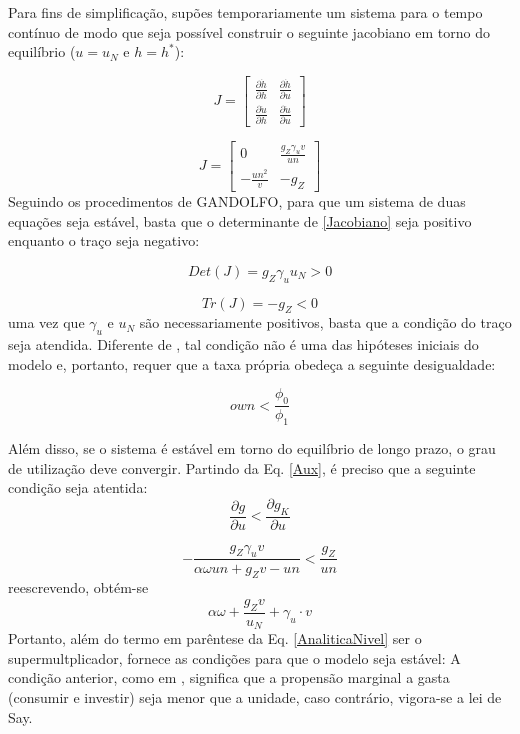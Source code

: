 Para fins de simplificação, supões temporariamente um sistema para o tempo contínuo de modo que seja possível construir o seguinte jacobiano em torno do equilíbrio ($u = u_N$ e $h = h^*$):

$$
J = 
\left[\begin{matrix}
\frac{\partial \dot h}{\partial h} & \frac{\partial \dot h}{\partial u}\\
\frac{\partial \dot u}{\partial h} & \frac{\partial \dot u}{\partial u}
\end{matrix}\right]
$$

\begin{equation}
J = 
\label{Jacobiano}
\left[\begin{matrix}0 & \frac{g_Z \gamma_{u} v}{un}\\- \frac{un^{2}}{v} & - g_Z\end{matrix}\right]
\end{equation}
Seguindo os procedimentos de GANDOLFO, para que um sistema de duas equações seja estável, basta que o determinante de \ref{Jacobiano} seja positivo enquanto o traço seja negativo:

$$
Det(J) = g_Z \gamma_{u} u_N > 0
$$

$$
Tr(J) = -g_Z < 0
$$
uma vez que $\gamma_u$ e $u_N$ são necessariamente positivos, basta que a condição do traço seja atendida. Diferente de \textcite{freitas_growth_2015}, tal condição não é uma das hipóteses iniciais do modelo e, portanto, requer que a taxa própria obedeça a seguinte desigualdade:

\begin{equation}
own < \frac{\phi_0}{\phi_1}
\end{equation}

Além disso, se o sistema é estável em torno do equilíbrio de longo prazo, o grau de utilização deve convergir. Partindo da Eq. \ref{Aux}, é preciso que a seguinte condição seja atentida:
$$
\frac{\partial g}{\partial u} < \frac{\partial g_K}{\partial u}
$$

$$
- \frac{g_Z \gamma_{u} v}{\alpha \omega un + g_Z v - un} < \frac{g_Z}{un}
$$
reescrevendo, obtém-se
\begin{equation}
\alpha \omega + \frac{g_Z v}{u_N} + \gamma_u\cdot v
\end{equation}
Portanto, além do termo em parêntese da Eq. \ref{AnaliticaNivel} ser o supermultplicador, fornece as condições para que o modelo seja estável: 
A condição anterior, como em \textcite{freitas_growth_2015}, significa que a propensão marginal a gasta (consumir e investir) seja menor que a unidade, caso contrário, vigora-se a lei de Say.


